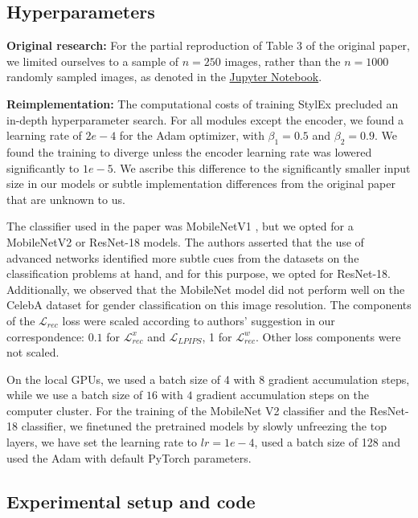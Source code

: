\subsection{Hyperparameters}

\textbf{Original research:} For the partial reproduction of Table 3 of the original paper, we limited ourselves to a sample of $n=250$ images, rather than the $n=1000$ randomly sampled images, as denoted in the \href{https://github.com/google/explaining-in-style}{Jupyter Notebook}.

\textbf{Reimplementation:} The computational costs of training StylEx precluded an in-depth hyperparameter search. For all modules except the encoder, we found a learning rate of $2e-4$ for the Adam optimizer, with $\beta_1 = 0.5$ and $\beta_2 = 0.9$. We found the training to diverge unless the encoder learning rate was lowered significantly to  $1e-5$. We ascribe this difference to the significantly smaller input size in our models or subtle implementation differences from the original paper that are unknown to us.

The classifier used in the paper was MobileNetV1 \cite{howard2017mobilenets}, but we opted for a MobileNetV2 \cite{sandler2019mobilenetv2} or ResNet-18 models\cite{7780459}. The authors asserted that the use of advanced networks identified more subtle cues from the datasets on the classification problems at hand, and for this purpose, we opted for ResNet-18. Additionally, we observed that the MobileNet model did not perform well on the CelebA dataset for gender classification on this image resolution. The components of the $\mathcal{L}_{rec}$ loss were scaled according to authors' suggestion in our correspondence: $0.1$ for $\mathcal{L}_{rec}^x$ and $\mathcal{L}_{LPIPS}$, 1 for $ \mathcal{L}_{rec}^w$. Other loss components were not scaled.

On the local GPUs, we used a batch size of 4 with 8 gradient accumulation steps, while we use a batch size of $16$ with $4$ gradient accumulation steps on the computer cluster. For the training of the MobileNet V2 classifier and the ResNet-18 classifier, we finetuned the pretrained models by slowly unfreezing the top layers, we have set the learning rate to $lr = 1e-4$, used a batch size of 128 and used the Adam \cite{kingma2017adam} with default PyTorch parameters.
 

\subsection{Experimental setup and code}

